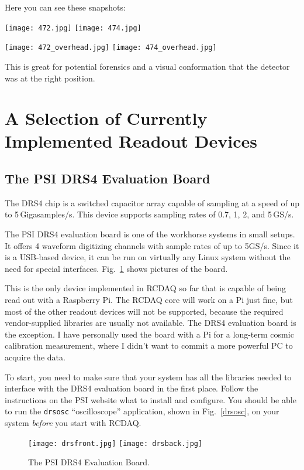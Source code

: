 \documentclass{article}[11pt]
\begin{document}
Here you can see these snapshots:

\texttt{[image: 472.jpg]}
\texttt{[image: 474.jpg]}

\texttt{[image: 472\_overhead.jpg]}
\texttt{[image: 474\_overhead.jpg]}

This is great for potential forensics and a visual conformation that the detector
was at the right position. 



\section{A Selection of Currently Implemented Readout Devices}

\subsection{The PSI DRS4 Evaluation Board}
\label{instructions}

The DRS4 chip is a switched capacitor array capable of sampling at a
speed of up to 5\,Gigasamples/s. This device supports sampling rates
of 0.7, 1, 2, and 5\,GS/s. 

The PSI DRS4 evaluation board is one of the workhorse systems in small
setups. It offers 4 waveform digitizing channels with sample rates of
up to 5GS/s. Since it is a USB-based device, it can be run on
virtually any Linux system without the need for special
interfaces. Fig.~\ref{drsevalboard} shows pictures of the board.

This is the only device implemented in RCDAQ so far that is capable of
being read out with a Raspberry Pi. The RCDAQ core will work on a Pi
just fine, but most of the other readout devices will not be
supported, because the required vendor-supplied libraries are usually
not available. The DRS4 evaluation board is the exception. I have
personally used the board with a Pi for a long-term cosmic calibration
measurement, where I didn't want to commit a more powerful PC to
acquire the data.

To start, you need to make sure that your system has all the libraries
needed to interface with the DRS4 evaluation board in the first
place. Follow the instructions on the PSI website what to install and
configure.  You should be able to run the \verb|drsosc|
``oscilloscope'' application, shown in Fig.~\ref{drsosc}, on your
system \emph{before} you start with RCDAQ.

\begin{figure}
  \centering
  \texttt{[image: drsfront.jpg]}
  \texttt{[image: drsback.jpg]}
  \caption{\label{drsevalboard}The PSI DRS4 Evaluation Board.}
\end{figure}
\end{document}
